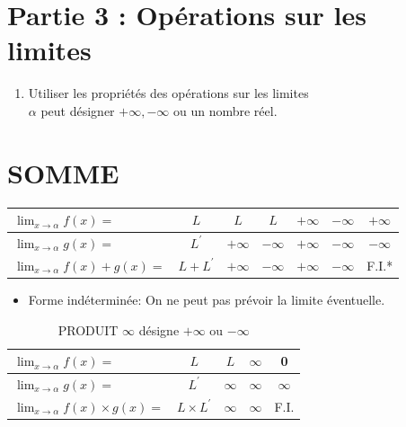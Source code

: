 \documentclass[10pt]{article}
\begin{document}
\section*{Partie 3 : Opérations sur les limites}
\begin{enumerate}
  \item Utiliser les propriétés des opérations sur les limites\\
$\alpha$ peut désigner $+\infty,-\infty$ ou un nombre réel.
\end{enumerate}

\section*{SOMME}
\begin{center}
\begin{tabular}{|l|c|c|c|c|c|c|}
\hline
$\lim _{x \rightarrow \alpha} f(x)=$ & $L$ & $L$ & $L$ & $+\infty$ & $-\infty$ & $+\infty$ \\
\hline
$\lim _{x \rightarrow \alpha} g(x)=$ & $L^{\prime}$ & $+\infty$ & $-\infty$ & $+\infty$ & $-\infty$ & $-\infty$ \\
\hline
$\lim _{x \rightarrow \alpha} f(x)+g(x)=$ & $L+L^{\prime}$ & $+\infty$ & $-\infty$ & $+\infty$ & $-\infty$ & F.I.* \\
\hline
\end{tabular}
\end{center}

\begin{itemize}
  \item Forme indéterminée: On ne peut pas prévoir la limite éventuelle.
\end{itemize}

\begin{table}[h]
\begin{center}
\captionsetup{labelformat=empty}
\caption{PRODUIT $\infty$ désigne $+\infty$ ou $-\infty$}
\begin{tabular}{|l|c|c|c|c|}
\hline
$\lim _{x \rightarrow \alpha} f(x)=$ & $L$ & $L$ & $\infty$ & 0 \\
\hline
$\lim _{x \rightarrow \alpha} g(x)=$ & $L^{\prime}$ & $\infty$ & $\infty$ & $\infty$ \\
\hline
$\lim _{x \rightarrow \alpha} f(x) \times g(x)=$ & $L \times L^{\prime}$ & $\infty$ & $\infty$ & F.I. \\
\hline
\end{tabular}
\end{center}
\end{table}
\end{document}
